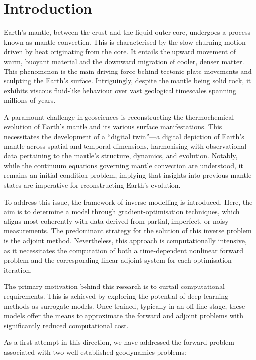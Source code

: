 \chapter{Introduction}

Earth's mantle, between the crust and the liquid outer core, undergoes a process known as mantle convection. This is characterised by the slow churning motion driven by heat originating from the core. It entails the upward movement of warm, buoyant material and the downward migration of cooler, denser matter. This phenomenon is the main driving force behind tectonic plate movements and sculpting the Earth's surface. Intriguingly, despite the mantle being solid rock, it exhibits viscous fluid-like behaviour over vast geological timescales spanning millions of years.

A paramount challenge in geosciences is reconstructing the thermochemical evolution of Earth's mantle and its various surface manifestations. This necessitates the development of a ``digital twin''—a digital depiction of Earth's mantle across spatial and temporal dimensions, harmonising with observational data pertaining to the mantle's structure, dynamics, and evolution. Notably, while the continuum equations governing mantle convection are understood, it remains an initial condition problem, implying that insights into previous mantle states are imperative for reconstructing Earth's evolution.

To address this issue, the framework of inverse modelling is introduced. Here, the aim is to determine a model through gradient-optimisation techniques, which aligns most coherently with data derived from partial, imperfect, or noisy measurements. The predominant strategy for the solution of this inverse problem is the adjoint method. Nevertheless, this approach is computationally intensive, as it necessitates the computation of both a time-dependent nonlinear forward problem and the corresponding linear adjoint system for each optimisation iteration.

The primary motivation behind this research is to curtail computational requirements. This is achieved by exploring the potential of deep learning methods as surrogate models. Once trained, typically in an off-line stage, these models offer the means to approximate the forward and adjoint problems with significantly reduced computational cost.

As a first attempt in this direction, we have addressed the forward problem associated with two well-established geodynamics problems: 

